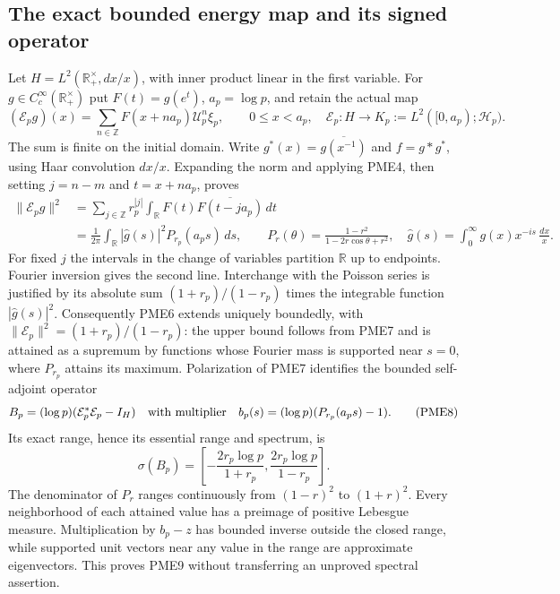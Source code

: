 \documentclass[11pt]{article}
\begin{document}
\subsection{The exact bounded energy map and its signed operator}

Let $H=L^2(\mathbb R_+^\times,dx/x)$, with inner product linear
in the first variable. For $g\in C_c^\infty(\mathbb R_+^\times)$
put $F(t)=g(e^t)$, $a_p=\log p$, and retain the actual map
\[
 (\mathcal E_pg)(x)=\sum_{n\in\mathbb Z}
 F(x+na_p)\mathscr U_p^n\xi_p,\qquad 0\le x<a_p,
 \quad
 \mathcal E_p:H\longrightarrow
 K_p:=L^2([0,a_p);\mathscr H_p).
 \tag{PME6}
\]
The sum is finite on the initial domain. Write
$g^*(x)=\overline{g(x^{-1})}$ and
$f=g*g^*$, using Haar convolution $dx/x$.
Expanding the norm and applying PME4, then setting $j=n-m$ and
$t=x+na_p$, proves
\[
 \begin{split}
 \|\mathcal E_pg\|^2
 &=\sum_{j\in\mathbb Z}r_p^{|j|}
       \int_{\mathbb R} F(t)\overline{F(t-ja_p)}\,dt\\
 &=\frac1{2\pi}\int_{\mathbb R}|\widehat g(s)|^2
       P_{r_p}(a_ps)\,ds,
 \qquad
 P_r(\theta)=\frac{1-r^2}{1-2r\cos\theta+r^2},
 \quad \widehat g(s)=\int_0^\infty g(x)x^{-is}\,\frac{dx}{x}.
 \end{split}
 \tag{PME7}
\]
For fixed $j$ the intervals in the change of variables partition
$\mathbb R$ up to endpoints. Fourier inversion gives the second
line. Interchange with the Poisson series is justified by its
absolute sum $(1+r_p)/(1-r_p)$ times the integrable function
$|\widehat g(s)|^2$. Consequently PME6 extends uniquely boundedly,
with $\|\mathcal E_p\|^2=(1+r_p)/(1-r_p)$: the upper bound follows
from PME7 and is attained as a supremum by functions whose Fourier
mass is supported near $s=0$, where $P_{r_p}$ attains its maximum.
Polarization of PME7 identifies the bounded self-adjoint operator
\[
 B_p=(\log p)(\mathcal E_p^*\mathcal E_p-I_H)
 \quad\hbox{with multiplier}\quad
 b_p(s)=(\log p)(P_{r_p}(a_ps)-1).
 \tag{PME8}
\]
Its exact range, hence its essential range and spectrum, is
\[
 \sigma(B_p)=
 \left[-\frac{2r_p\log p}{1+r_p},
         \frac{2r_p\log p}{1-r_p}\right].
 \tag{PME9}
\]
The denominator of $P_r$ ranges continuously from $(1-r)^2$ to
$(1+r)^2$. Every neighborhood of each attained value has a preimage
of positive Lebesgue measure. Multiplication by $b_p-z$ has bounded
inverse outside the closed range, while supported unit vectors near
any value in the range are approximate eigenvectors. This proves
PME9 without transferring an unproved spectral assertion.
\end{document}

